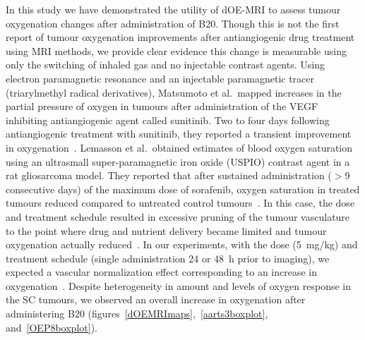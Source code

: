 In this study we have demonstrated the utility of \acs{dOE-MRI} to assess tumour oxygenation changes after administration of B20.
Though this is not the first report of tumour oxygenation improvements after antiangiogenic drug treatment using MRI methods, we provide clear evidence this change is measurable using only the switching of inhaled gas and no injectable contrast agents.
Using electron paramagnetic resonance and an injectable paramagnetic tracer (triarylmethyl radical derivatives), Matsumoto et al.\ mapped increases in the partial pressure of oxygen in tumours after administration of the VEGF inhibiting antiangiogenic agent called sunitinib.
Two to four days following antiangiogenic treatment with sunitinib, they reported a transient improvement in oxygenation~\cite{Matsumoto:2011iv}.
Lemasson et al.\ obtained estimates of blood oxygen saturation using an ultrasmall super-paramagnetic iron oxide (\acs{USPIO}) contrast agent in a rat gliosarcoma model.
They reported that after sustained administration ($>$9 consecutive days) of the maximum dose of sorafenib, oxygen saturation in treated tumours reduced compared to untreated control tumours~\cite{Lemasson:2012dl}.
In this case, the dose and treatment schedule resulted in excessive pruning of the tumour vasculature to the point where drug and nutrient delivery became limited and tumour oxygenation actually reduced~\cite{Jain:2013jc}.
In our experiments, with the dose (5~mg/kg) and treatment schedule (single administration 24 or 48~h prior to imaging), we expected a vascular normalization effect corresponding to an increase in oxygenation~\cite{Chauhan:2012bm,Jain:2013jc,Huang:2012kn}.
Despite heterogeneity in amount and levels of oxygen response in the \acs{SC} tumours, we observed an overall increase in oxygenation after administering B20 (figures~\ref{dOEMRImaps},~\ref{aarts3boxplot}, and~\ref{OEP8boxplot}).

